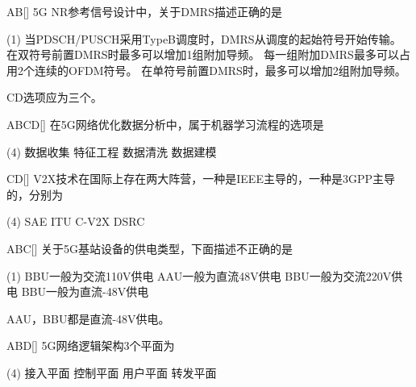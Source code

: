 \begin{choice}{\;AB\;}[]
    5G NR参考信号设计中，关于DMRS描述正确的是
    \begin{tasks}(1)
        \task 当PDSCH/PUSCH采用TypeB调度时，DMRS从调度的起始符号开始传输。
        \task 在双符号前置DMRS时最多可以增加1组附加导频。
        \task 每一组附加DMRS最多可以占用2个连续的OFDM符号。
        \task 在单符号前置DMRS时，最多可以增加2组附加导频。
    \end{tasks}
\end{choice}
\begin{solution}
    CD选项应为三个。

\end{solution}

\begin{choice}{\;ABCD\;}[]
    在5G网络优化数据分析中，属于机器学习流程的选项是
    \begin{tasks}(4)
        \task 数据收集
        \task 特征工程
        \task 数据清洗
        \task 数据建模
    \end{tasks}
\end{choice}


\begin{choice}{\;CD\;}[]
    V2X技术在国际上存在两大阵营，一种是IEEE主导的，一种是3GPP主导的，分别为
    \begin{tasks}(4)
        \task SAE
        \task ITU
        \task C-V2X
        \task DSRC
    \end{tasks}
\end{choice}


\begin{choice}{\;ABC\;}[]
    关于5G基站设备的供电类型，下面描述不正确的是
    \begin{tasks}(1)
        \task BBU一般为交流110V供电
        \task AAU一般为直流48V供电
        \task BBU一般为交流220V供电
        \task BBU一般为直流-48V供电
    \end{tasks}
\end{choice}
\begin{solution}
    AAU，BBU都是直流-48V供电。

\end{solution}

\begin{choice}{\;ABD\;}[]
    5G网络逻辑架构3个平面为
    \begin{tasks}(4)
        \task 接入平面
        \task 控制平面
        \task 用户平面
        \task 转发平面
    \end{tasks}
\end{choice}

